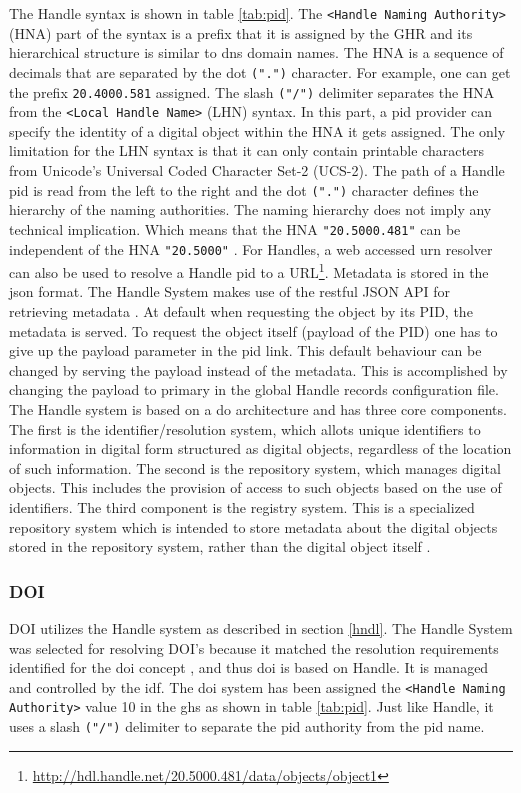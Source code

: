 The Handle syntax is shown in table \ref{tab:pid}. The \texttt{\textless Handle Naming Authority\textgreater} (HNA) part of the syntax is a prefix that it is assigned by the GHR and its hierarchical structure is similar to \gls{dns} domain names. The HNA is a sequence of decimals that are separated by the dot \texttt{(".")} character. For example, one can get the prefix \texttt{20.4000.581} assigned. The slash \texttt{("/")} delimiter separates the HNA from the \texttt{\textless Local Handle Name\textgreater} (LHN) syntax. In this part, a \gls{pid} provider can specify the identity of a digital object within the HNA it gets assigned. The only limitation for the LHN syntax is that it can only contain printable characters from Unicode's Universal Coded Character Set-2 (UCS-2). The path of a Handle \gls{pid} is read from the left to the right and the dot \texttt{(".")} character defines the hierarchy of the naming authorities. The naming hierarchy does not imply any technical implication. Which means that the HNA \texttt{"20.5000.481"} can be independent of the HNA \texttt{"20.5000"} \cite{icn-bd}. For Handles, a web accessed \gls{urn} resolver can also be used to resolve a Handle \gls{pid} to a URL\footnote{\url{http://hdl.handle.net/20.5000.481/data/objects/object1}}. Metadata is stored in the \gls{json} format. %
The Handle System makes use of the restful JSON API for retrieving metadata \cite{hdl-api}. At default when requesting the object by its PID, the metadata is served. To request the object itself (payload of the PID) one has to give up the payload parameter in the \gls{pid} link. This default behaviour can be changed by serving the payload instead of the metadata. This is accomplished by changing the payload to primary in the global Handle records configuration file.
The Handle system is based on a \gls{do} architecture and has three core components. The first is the identifier/resolution system, which allots unique identifiers to information in digital form structured as digital objects, regardless of the location of such information. The second is the repository system, which manages digital objects. This includes the provision of access to such objects based on the use of identifiers. The third component is the registry system. This is a specialized repository system which is intended to store metadata about the digital objects stored in the repository system, rather than the digital object itself \cite{dona-1}.

\subsubsection{DOI}\label{doi}
DOI utilizes the Handle system as described in section \ref{hndl}. The Handle System was selected for resolving DOI's because it matched the resolution requirements identified for the \gls{doi} concept \cite{doi-found}, and thus \gls{doi} is based on Handle. It is managed and controlled by the \gls{idf}. The \gls{doi} system has been assigned the \texttt{<Handle Naming Authority>} value 10 in the \gls{ghs} as shown in table \ref{tab:pid}. Just like Handle, it uses a slash \texttt{("/")} delimiter to separate the \gls{pid} authority from the \gls{pid} name.


